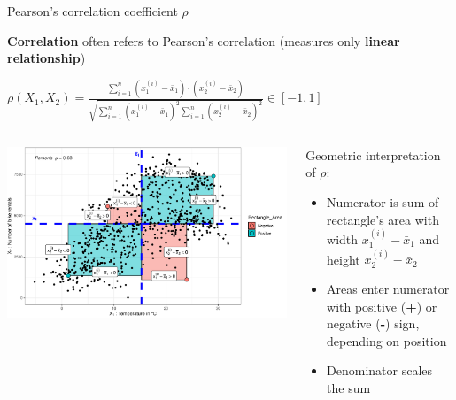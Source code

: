 \documentclass[11pt,compress,t,notes=noshow, aspectratio=169, xcolor=table]{beamer}
\begin{document}
\begin{frame}{Pearson's correlation coefficient $\rho$}

\textbf{Correlation} often refers to Pearson's correlation (measures only \textbf{linear relationship}) %
\smallskip



\centerline{$\rho(X_1, X_2) = \tfrac{\sum_{i=1}^{n}{(x_1^{(i)}-\bar{x}_1) \cdot (x_2^{(i)}-\bar{x}_2)}}{\sqrt{\sum_{i=1}^{n}{(x_1^{(i)}-\bar{x}_1)^2 \sum_{i=1}^{n}{(x_2^{(i)}-\bar{x}_2)^2 }}}} \in [-1, 1]$}

\bigskip

\begin{columns}[T, totalwidth=\textwidth]
\begin{column}{0.6\linewidth}
\includegraphics[width = \textwidth]{figure/pearson_cor}
\end{column}
\begin{column}{0.4\linewidth}

Geometric interpretation of $\rho$:
\begin{itemize}
    \item Numerator is sum of rectangle's area with width $x_1^{(i)}-\bar{x}_1$ and height $x_2^{(i)}-\bar{x}_2$
    \item Areas enter numerator with positive (\textbf{+}) or negative (\textbf{-}) sign, depending on position
    \item Denominator scales the sum
\end{itemize}
\end{column}
\end{columns}


\end{frame}
\end{document}
